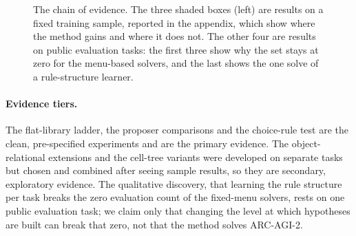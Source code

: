 \documentclass[sigconf,nonacm]{acmart}
\begin{document}
\begin{figure}[t]
\centering
{}
\caption{The chain of evidence. The three shaded boxes (left) are results on a fixed training sample, reported in the appendix, which show where the method gains and where it does not. The other four are results on public evaluation tasks: the first three show why the set stays at zero for the menu-based solvers, and the last shows the one solve of a rule-structure learner.}
\label{fig:chain}
\end{figure}

\paragraph{Evidence tiers.} The flat-library ladder, the proposer comparisons and the choice-rule test are the clean, pre-specified experiments and are the primary evidence. The object-relational extensions and the cell-tree variants were developed on separate tasks but chosen and combined after seeing sample results, so they are secondary, exploratory evidence. The qualitative discovery, that learning the rule structure per task breaks the zero evaluation count of the fixed-menu solvers, rests on one public evaluation task; we claim only that changing the level at which hypotheses are built can break that zero, not that the method solves ARC-AGI-2.
\end{document}
